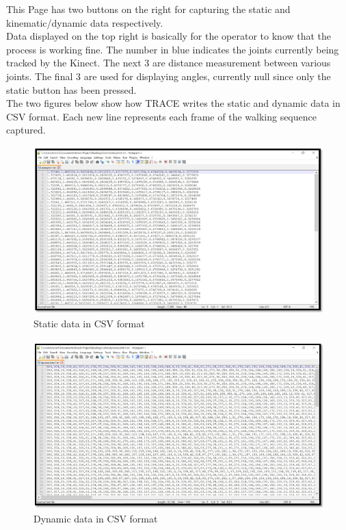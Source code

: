 This Page has two buttons on the right for capturing the static and kinematic/dynamic data respectively. \\
Data displayed on the top right is basically for the operator to know that the process is working fine. The number in blue indicates the joints currently being tracked by the Kinect. The next 3 are distance measurement between various joints. The final 3 are used for displaying angles, currently null since only the static button has been pressed.\\
The two figures below show how TRACE writes the static and dynamic data in CSV format. Each new line represents each frame of the walking sequence captured.\\
\begin{figure}[h]
\centering
\includegraphics[scale=0.7]{static.png}
\caption{Static data in CSV format}
\end{figure}

\begin{figure}[h]
\centering
\includegraphics[scale=0.5]{dynamic.png}
\caption{Dynamic data in CSV format}
\end{figure}


